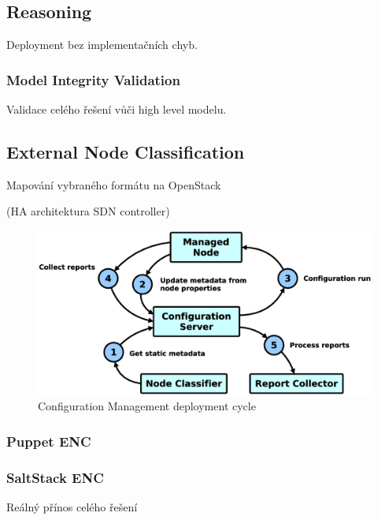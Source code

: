 \subsection{Reasoning}

Deployment bez implementačních chyb.

\subsubsection{Model Integrity Validation}

Validace celého řešení vůči high level modelu.

\subsection{External Node Classification}

Mapování vybraného formátu na OpenStack

(HA architektura SDN controller)

\begin{figure}[!h]
\centering
\includegraphics[scale=.15]{img/cm_cycle.eps}
\caption{Configuration Management deployment cycle}
\label{fig:cm}
\end{figure}

\subsubsection{Puppet ENC}

\subsubsection{SaltStack ENC}

Reálný přínos celého řešení
